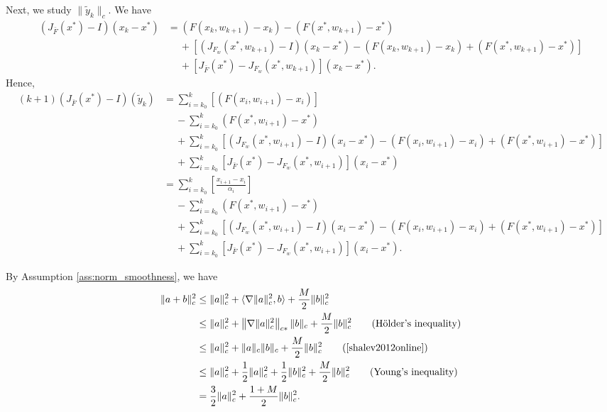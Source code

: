 \documentclass[letterpaper, 10 pt]{article}
\newcommand{\ty}{\tilde{y}}
\begin{document}
Next, we study $\|\tilde{y}_k\|_c$. We have
\begin{align*}
    (J_{\bar{F}}(x^*)-I)(x_k-x^*)  &= (F(x_k,w_{k+1})-x_k) - (F(x^*,w_{k+1})-x^*)\\
    &\quad~+ [(J_{F_w}(x^*,w_{k+1})-I)(x_k-x^*) - (F(x_k,w_{k+1})-x_k) + (F(x^*,w_{k+1})-x^*)]\\
    &\quad~+[J_{\bar{F}}(x^*)-J_{F_w}(x^*,w_{k+1})](x_k-x^*).
\end{align*}
Hence, 
\begin{align}
    (k+1)\left(J_{\bar{F}}(x^*)-I \right)(\ty_k) 
    &=   \sum\limits_{i=k_0}^{k} \left[(F(x_i,w_{i+1})-x_i)  \right] \nonumber\\
    &\quad~-  \sum\limits_{i=k_0}^{k}   (F(x^*,w_{i+1})-x^*) \nonumber\\
    &\quad~+ \sum\limits_{i=k_0}^{k} [(J_{F_w}(x^*,w_{i+1})-I)(x_i-x^*) - (F(x_i,w_{i+1})-x_i) + (F(x^*,w_{i+1})-x^*)]\nonumber\\
    &\quad~+\sum\limits_{i=k_0}^{k} [J_{\bar{F}}(x^*)-J_{F_w}(x^*,w_{i+1})](x_i-x^*) \nonumber\\
    &=   \sum\limits_{i=k_0}^{k} \left[\frac{x_{i+1}-x_i}{\alpha_i}  \right] \nonumber\\
    &\quad~-  \sum\limits_{i=k_0}^{k}   (F(x^*,w_{i+1})-x^*) \nonumber\\
    &\quad~+\sum\limits_{i=k_0}^{k} [(J_{F_w}(x^*,w_{i+1})-I)(x_i-x^*) - (F(x_i,w_{i+1})-x_i) + (F(x^*,w_{i+1})-x^*)]\nonumber\\
    &\quad~+\sum\limits_{i=k_0}^{k} [J_{\bar{F}}(x^*)-J_{F_w}(x^*,w_{i+1})](x_i-x^*). \label{eq:expansion}
\end{align}  

By Assumption \ref{ass:norm_smoothness}, we have
\begin{align}
    \|a+b\|_c^2 &\leq \|a\|_c^2+\langle \nabla \|a\|_c^2,b\rangle+ \frac{M}{2}\|b\|_c^2\nonumber\\
    &\leq \|a\|_c^2+\left\| \nabla \|a\|_c^2\right\|_{c*}\|b\|_c+ \frac{M}{2}\|b\|_c^2\tag{H\"older's inequality}\\
    &\leq \|a\|_c^2+\| a\|_{c}\|b\|_c+ \frac{M}{2}\|b\|_c^2\tag{\cite[Lemma 2.6]{shalev2012online}}\\
    &\leq \|a\|_c^2+\frac{1}{2}\| a\|_{c}^2 + \frac{1}{2}\|b\|_c^2+ \frac{M}{2}\|b\|_c^2\tag{Young's inequality}\\
    &= \frac{3}{2}\|a\|_c^2 + \frac{1+M}{2}\|b\|_c^2.\label{eq:magic}
\end{align}
\end{document}
